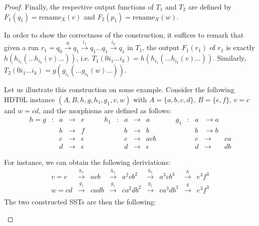 \documentclass{llncs}
\begin{document}
\begin{proof}
Finally, the respective output functions of $T_1$ and $T_2$ are 
defined by $F_1(q_1) = \text{rename}_X(v)$ and $F_2(p_1) = \text{rename}_X(w)$.

In order to show the correctness of the construction, it suffices to
remark that given a run $r_1 = q_0\xrightarrow{0}
q_1\xrightarrow{i_1}q_1\dots q_1\xrightarrow{i_k} q_1$ in $T_1$, the
output $F_1(r_1)$ of $r_1$ is exactly $h(h_{i_1}(\dots
h_{i_k}(v)\dots))$, i.e. $T_1(0i_1\dots i_k) =  h(h_{i_1}(\dots
h_{i_k}(v)\dots))$. Similarly, $T_2(0i_1\dots i_k) = g(g_{i_1}(\dots
g_{i_k}(w)\dots))$.

\begin{example} Let us illustrate this construction on some example. Consider the
    following HDT0L instance $(A,B,h,g,h_1,g_1,v,w)$ with $A = 
    \{a,b,c,d\}$, $B = \{ e,f\}$, $v = c$ and $w = cd$, and the
    morphisms are defined as follows:
    $$
    \begin{array}{cccccccccccccccccccccccccc}

        h = g & : & a & \rightarrow & e &\qquad h_1 & : & a & \rightarrow & a &
        \qquad g_1 & : &  a & \rightarrow a \\
           &   &  b & \rightarrow & f & & & b & \rightarrow & b & & &
           b & \rightarrow b \\
            &   &  c & \rightarrow & \epsilon & & & c & \rightarrow &
            acb & & & c & \rightarrow & ca\\
            &   & d & \rightarrow & \epsilon & & &  d & \rightarrow &
            \epsilon & & & d & \rightarrow & db 
    \end{array}
    $$

    For instance, we can obtain the following deriviations:
    $$
    \begin{array}{ccccccccccccccccccccccc}
    v = c & \xrightarrow{h_1} & acb
    & \xrightarrow{h_1} & a^2cb^2 & \xrightarrow{h_1} & a^3cb^3
    & \xrightarrow{h} & e^3f^3 \\

    w = cd & \xrightarrow{g_1} & cadb
    & \xrightarrow{g_1} & ca^2db^2 & \xrightarrow{g_1} & ca^3db^3
    & \xrightarrow{g} & e^3f^3 \\
    \end{array}
    $$
The two constructed SSTs are then the following:


\end{example}
\end{proof}
\end{document}
